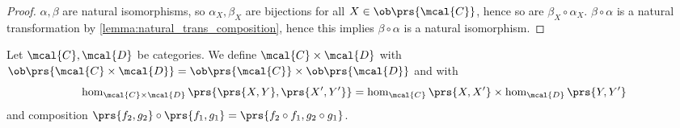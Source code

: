 \documentclass[10pt]{article}
\begin{document}
\begin{solution}
\begin{comment}
\begin{proof}
The large small squares in
\[
\begin{tikzcd}
F\prs{X} \arrow[r, "\alpha_X"] \arrow[d, "F\prs{f}"] &
G\prs{X} \arrow[r, "\beta_X"] \arrow[d, "G\prs{f}"] &
H\prs{X} \arrow[d, "H\prs{f}"] \\
F\prs{Y} \arrow[r, "\alpha_Y"] &
G\prs{Y} \arrow[r, "\beta_Y"] &
H\prs{Y}
\end{tikzcd}
\]
commute for all $f \in \hom_{\mcal{C}}\prs{X,Y}$ since $\alpha,\beta$ are natural transformations.

This implies in general that the large square (it's a rectangle, but people call those squares) commutes for indeed
\begin{align*}
H\prs{f} \circ \beta_X \circ \alpha_X &= \prs{H\prs{f} \circ \beta_X} \circ \alpha
\\&= \beta_Y \circ G\prs{f} \circ \alpha_X
\\&= \beta_Y \circ \prs{G\prs{f} \circ \alpha_X}
\\&= \beta_Y \circ \alpha_Y \circ F\prs{f} \text{.}
\end{align*} 
\end{proof}

\begin{lemma}\label{lemma:natural_iso_composition}
Let $F,G,H \colon \mcal{C} \to \mcal{H}$ and let $\alpha \colon F \to G$ and $\beta \colon G \to H$ be natural isomorphisms. $\beta \circ \alpha$ is also a natural isomorphism.
\end{lemma}

\end{comment}

\begin{proof}
$\alpha,\beta$ are natural isomorphisms, so $\alpha_X, \beta_X$ are bijections for all $X \in \ob\prs{\mcal{C}}$, hence so are $\beta_X \circ \alpha_X$.
$\beta \circ \alpha$ is a natural transformation by \eqref{lemma:natural_trans_composition}, hence this implies $\beta \circ \alpha$ is a natural isomorphism.
\end{proof}

\begin{definition}
Let $\mcal{C}, \mcal{D}$ be categories. We define $\mcal{C} \times \mcal{D}$ with $\ob\prs{\mcal{C} \times \mcal{D}} = \ob\prs{\mcal{C}} \times \ob\prs{\mcal{D}}$ and with
\[\hom_{\mcal{C} \times \mcal{D}}\prs{\prs{X,Y}, \prs{X',Y'}} = \hom_{\mcal{C}}\prs{X, X'} \times \hom_{\mcal{D}}\prs{Y,Y'}\]
and composition $\prs{f_2, g_2} \circ \prs{f_1, g_1} = \prs{f_2 \circ f_1, g_2 \circ g_1}$.
\end{definition}


\end{solution}
\end{document}
